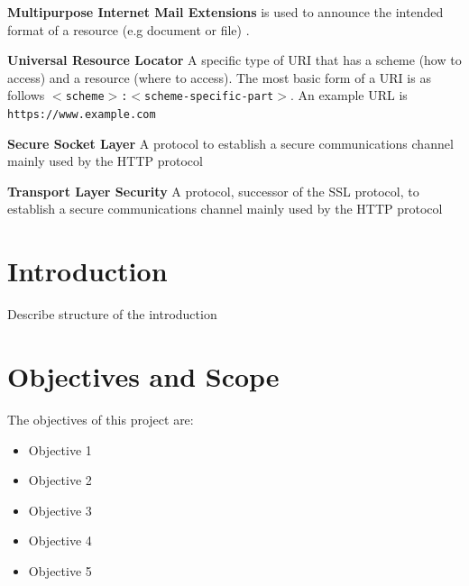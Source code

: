 \documentclass{mscreport}
\begin{document}
\begin{hangparas}{.25in}{1}
\textbf{Multipurpose Internet Mail Extensions} is used to announce the intended format of a resource (e.g document or file) \cite{Freed2013-yn}. \par
\vspace{0.5cm}
\textbf{Universal Resource Locator} A specific type of URI that has a scheme (how to access) and a resource (where to access). The most basic form of a URI is as follows \texttt{$<$scheme$>$:$<$scheme-specific-part$>$}. An example URL is \texttt{https://www.example.com} \par
\vspace{0.5cm}
\textbf{Secure Socket Layer} A protocol to establish a secure communications channel mainly used by the HTTP protocol \par
\vspace{0.5cm}
\textbf{Transport Layer Security} A protocol, successor of the SSL protocol, to establish a secure communications channel mainly used by the HTTP protocol \par

\end{hangparas}

\newpage

\listoffigures

\newpage
{}
\listoftables

\newpage





\tableofcontents

\newpage
{}
\section{Introduction}

Describe structure of the introduction

\section{Objectives and Scope}

The objectives of this project are:
\begin{itemize}
  \item Objective 1
  \item Objective 2
  \item Objective 3
  \item Objective 4
  \item Objective 5
\end{itemize}  
\end{document}
